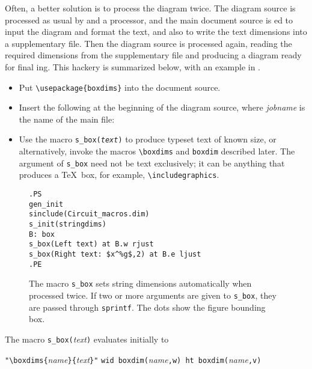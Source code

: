 Often, a better solution is to process the diagram twice.  The
diagram source is processed as usual by \Mfour and a \pic processor, and the
main document source is \latex{}ed to input the diagram and format the
text, and also to write the text dimensions into a supplementary file.
Then the diagram source is processed again, reading the required
dimensions from the supplementary file and producing a diagram ready
for final \latex{}ing.
This hackery is summarized below, with an example in .
\begin{itemize}
\item Put \verb|\usepackage{boxdims}| into the document source.
\item Insert the following at the beginning of the diagram source,
 where {\sl jobname} is the name of the main \latex file:\hfill\break
\item Use the macro {\tt s\_box({\sl text})} to produce
 typeset text of known size, or alternatively, invoke the macros
 \verb|\boxdims| and \verb|boxdim| described later.
 The argument of {\tt s\_box} need not be text exclusively; it can
 be anything that produces a \TeX\ box, for example, \verb|\includegraphics|.
\end{itemize}
\begin{figure}[ht]
   \parbox{3.5in}{\small\tt.PS\\
     gen\_init\\
     sinclude(Circuit\_macros.dim)\\
     s\_init(stringdims)\\
     B: box\\
       \hbox{}\quad s\_box(Left text) at B.w rjust\\
       \hbox{}\quad s\_box(Right text: \$x\^{}{\%g}\$,2) at B.e ljust\\
     .PE}%
   \hfill\llap{\raise-0.25in\hbox{ }}%
   \caption{The macro {\tt s\_box} sets string dimensions automatically
    when processed twice.  If two or more arguments are
    given to {\tt s\_box}, they
    are passed through {\tt sprintf}.  The dots show the figure bounding box.}
   \label{stringdim}
   \end{figure}

\noindent The macro \verb|s_box(|{\sl text}\verb|)| evaluates initially to

 \verb|"\boxdims{|{\sl name}\verb|}{|{\sl text}\verb|}"|
  \verb|wid boxdim(|{\sl name}\verb|,w) ht boxdim(|{\sl name}\verb|,v)|

